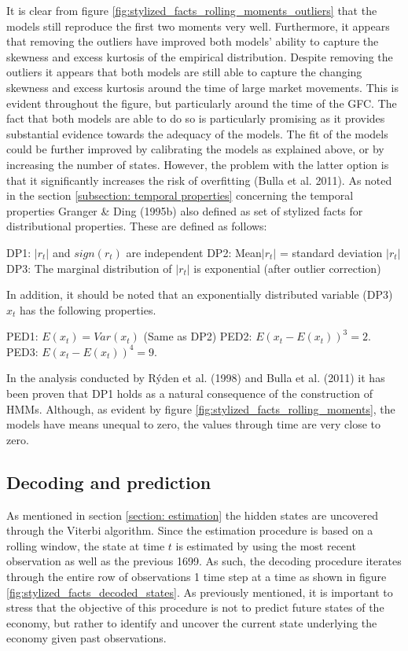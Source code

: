 It is clear from figure \ref{fig:stylized_facts_rolling_moments_outliers} that the models still reproduce the first two moments very well. Furthermore, it appears that removing the outliers have improved both models' ability to capture the skewness and excess kurtosis of the empirical distribution. Despite removing the outliers it appears that both models are still able to capture the changing skewness and excess kurtosis around the time of large market movements. This is evident throughout the figure, but particularly around the time of the GFC. The fact that both models are able to do so is particularly promising as it provides substantial evidence towards the adequacy of the models. The fit of the models could be further improved by calibrating the models as explained above, or by increasing the number of states. However, the problem with the latter option is that it significantly increases the risk of overfitting (Bulla et al. 2011). As noted in the section \ref{subsection: temporal properties} concerning the temporal properties Granger \& Ding (1995b) also defined as set of stylized facts for distributional properties. These are defined as follows:

DP1: $|r_t|$ and $sign(r_t)$ are independent\newline
DP2: Mean$|r_t|$ = standard deviation $|r_t|$ \newline
DP3: The marginal distribution of $|r_t|$ is exponential (after outlier correction)

In addition, it should be noted that an exponentially distributed variable (DP3) $x_t$ has the following properties.

PED1: $E(x_t) = Var(x_t)$ (Same as DP2) \newline
PED2: $E(x_t-E(x_t))^3 = 2.$ \newline
PED3: $E(x_t-E(x_t))^4 = 9.$

In the analysis conducted by Rýden et al. (1998) and Bulla et al. (2011) it has been proven that DP1 holds as a natural consequence of the construction of HMMs. Although, as evident by figure \ref{fig:stylized_facts_rolling_moments}, the models have means unequal to zero, the values through time are very close to zero.  

\subsection{Decoding and prediction}
As mentioned in section \ref{section: estimation} the hidden states are uncovered through the Viterbi algorithm. Since the estimation procedure is based on a rolling window, the state at time $t$ is estimated by using the most recent observation as well as the previous 1699. As such, the decoding procedure iterates through the entire row of observations 1 time step at a time as shown in figure \ref{fig:stylized_facts_decoded_states}. As previously mentioned, it is important to stress that the objective of this procedure is not to predict future states of the economy, but rather to identify and uncover the current state underlying the economy given past observations. 


